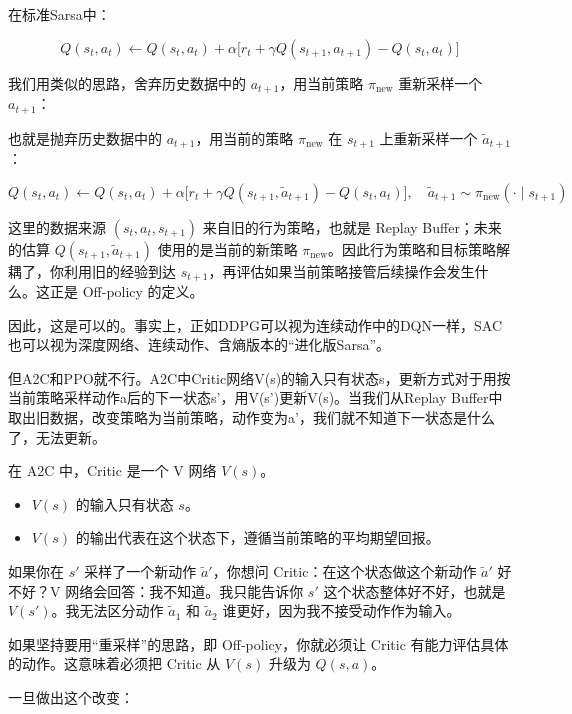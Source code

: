 在标准Sarsa中：

\[
Q(s_t,a_t)
\leftarrow
Q(s_t,a_t)
+
\alpha
\bigl[
r_t
+
\gamma Q(s_{t+1},a_{t+1})
-
Q(s_t,a_t)
\bigr]
\]

我们用类似的思路，舍弃历史数据中的 \(a_{t+1}\)，用当前策略 \(\pi_{\mathrm{new}}\) 重新采样一个 \(a_{t+1}\)：

也就是抛弃历史数据中的 \(a_{t+1}\)，用当前的策略 \(\pi_{\mathrm{new}}\) 在 \(s_{t+1}\) 上重新采样一个 \(\tilde{a}_{t+1}\)：

\[
Q(s_t,a_t)
\leftarrow
Q(s_t,a_t)
+
\alpha
\bigl[
r_t
+
\gamma Q(s_{t+1},\tilde{a}_{t+1})
-
Q(s_t,a_t)
\bigr],
\quad
\tilde{a}_{t+1}\sim\pi_{\mathrm{new}}(\cdot\mid s_{t+1})
\]

这里的数据来源 \((s_t,a_t,s_{t+1})\) 来自旧的行为策略，也就是 Replay Buffer；未来的估算 \(Q(s_{t+1},\tilde{a}_{t+1})\) 使用的是当前的新策略 \(\pi_{\mathrm{new}}\)。因此行为策略和目标策略解耦了，你利用旧的经验到达 \(s_{t+1}\)，再评估如果当前策略接管后续操作会发生什么。这正是 Off-policy 的定义。

因此，这是可以的。事实上，正如DDPG可以视为连续动作中的DQN一样，SAC也可以视为深度网络、连续动作、含熵版本的``进化版Sarsa''。

但A2C和PPO就不行。A2C中Critic网络V(s)的输入只有状态s，更新方式对于用按当前策略采样动作a后的下一状态s'，用V(s')更新V(s)。当我们从Replay Buffer中取出旧数据，改变策略为当前策略，动作变为a'，我们就不知道下一状态是什么了，无法更新。

在 A2C 中，Critic 是一个 V 网络 \(V(s)\)。

\begin{itemize}
\tightlist
\item
  \(V(s)\) 的输入只有状态 \(s\)。
\item
  \(V(s)\) 的输出代表在这个状态下，遵循当前策略的平均期望回报。
\end{itemize}

如果你在 \(s'\) 采样了一个新动作 \(\tilde{a}'\)，你想问 Critic：在这个状态做这个新动作 \(\tilde{a}'\) 好不好？V 网络会回答：我不知道。我只能告诉你 \(s'\) 这个状态整体好不好，也就是 \(V(s')\)。我无法区分动作 \(\tilde{a}_1\) 和 \(\tilde{a}_2\) 谁更好，因为我不接受动作作为输入。

如果坚持要用``重采样''的思路，即 Off-policy，你就必须让 Critic 有能力评估具体的动作。这意味着必须把 Critic 从 \(V(s)\) 升级为 \(Q(s,a)\)。

一旦做出这个改变：

